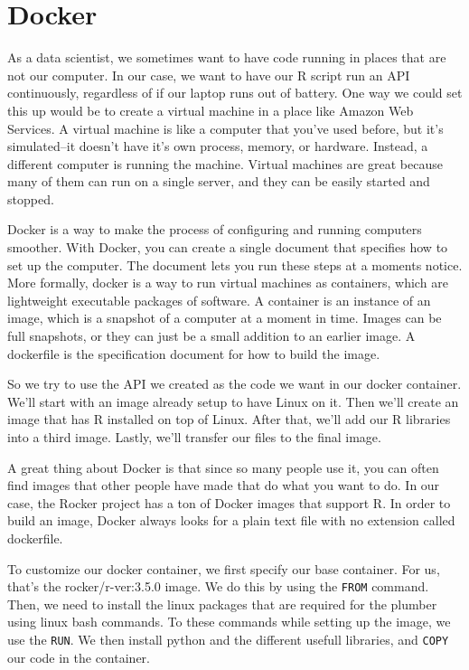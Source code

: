 \documentclass[]{book}
\begin{document}
\hypertarget{docker}{%
\section{Docker}\label{docker}}

As a data scientist, we sometimes want to have code running in places that are not our computer. In our case, we want to have our R script run an API continuously, regardless of if our laptop runs out of battery.
One way we could set this up would be to create a virtual machine in a place like Amazon Web Services. A virtual machine is like a computer that you've used before, but it's simulated--it doesn't have it's own process, memory, or hardware. Instead, a different computer is running the machine. Virtual machines are great because many of them can run on a single server, and they can be easily started and stopped.

Docker is a way to make the process of configuring and running computers smoother. With Docker, you can create a single document that specifies how to set up the computer. The document lets you run these steps at a moments notice. More formally, docker is a way to run virtual machines as containers, which are lightweight executable packages of software. A container is an instance of an image, which is a snapshot of a computer at a moment in time. Images can be full snapshots, or they can just be a small addition to an earlier image. A dockerfile is the specification document for how to build the image.

So we try to use the API we created as the code we want in our docker container. We'll start with an image already setup to have Linux on it. Then we'll create an image that has R installed on top of Linux. After that, we'll add our R libraries into a third image. Lastly, we'll transfer our files to the final image.

A great thing about Docker is that since so many people use it, you can often find images that other people have made that do what you want to do. In our case, the Rocker project has a ton of Docker images that support R.
In order to build an image, Docker always looks for a plain text file with no extension called dockerfile.

To customize our docker container, we first specify our base container. For us, that's the rocker/r-ver:3.5.0 image. We do this by using the \texttt{FROM} command. Then, we need to install the linux packages that are required for the plumber using linux bash commands. To these commands while setting up the image, we use the \texttt{RUN}. We then install python and the different usefull libraries, and \texttt{COPY} our code in the container.
\end{document}
